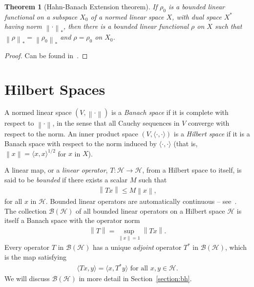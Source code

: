 \documentclass[11pt,a4paper]{report}
\theoremstyle{plain}
\newtheorem*{thm*}{Theorem}
\theoremstyle{definition}
\newcommand{\1}{\mathbbm{1}}
\renewcommand{\H}{\mathcal{H}}
\newcommand{\B}{\mathcal{B}}
\newcommand{\BH}{\mathcal{\B(\H)}}
\begin{document}
\begin{thm*}[Hahn-Banach Extension theorem] 
	If $\rho_0$ is a bounded linear functional on a subspace $X_0$ of a normed 
	linear space $X$, with dual space $X^\ast$ having norm $\left\|\cdot\right\|_\ast$, 
	then there is a bounded linear functional $\rho$ on $X$ such that 
 	$\left\|\rho\right\|_\ast=\left\|\rho_0\right\|_\ast$ and $\rho=\rho_0$ on $X_0$.
\end{thm*}
\begin{proof}
	Can be found in~\cite[Theorem 1.6.1, p.~44]{kadison83}.
\end{proof}

\section{Hilbert Spaces}\label{section:hscons}
A normed linear space $(V,\left\|\cdot\right\|)$ is a \emph{Banach space} if it 
is complete with respect to $\left\|\cdot\right\|$, in the sense that all Cauchy 
sequences in $V$ converge with respect to the norm. An inner product space 
$(V,\langle\cdot,\cdot\rangle)$ is a \emph{Hilbert space} if it is a Banach 
space with respect to the norm induced by $\langle\cdot,\cdot\rangle$ (that is,
$\left\|x\right\| = \langle x,x\rangle^{1/2}$ for $x$ in $X$).

A linear map, or a \emph{linear operator}, $T:\H\to\H$, from a Hilbert space to 
itself, is said to be \emph{bounded} if there exists a scalar $M$ such that 
\begin{align*}
	\left\|Tx\right\| \leq M \left\|x\right\|,
\end{align*}
for all $x$ in $\H$. Bounded linear operators are automatically continuous -- 
see~\cite[1.32]{rudin91}. The collection $\BH$ of all bounded linear operators 
on a Hilbert space $\H$ is itself a Banach space with the operator norm 
\begin{align*}
	 \left\| T \right\| = \sup_{\|x\|=1} \left \|  Tx \right\|.
\end{align*}
Every operator $T$ in $\BH$ has a unique \emph{adjoint} operator $T^\ast$ in 
$\BH$, which is the map satisfying 
\begin{align*}
	\langle Tx , y \rangle = \langle x,T^\ast y \rangle \mbox{ for all } x,y \in \H.
\end{align*}
We will discuss $\BH$ in more detail in Section~\ref{section:bh}. 
\end{document}
